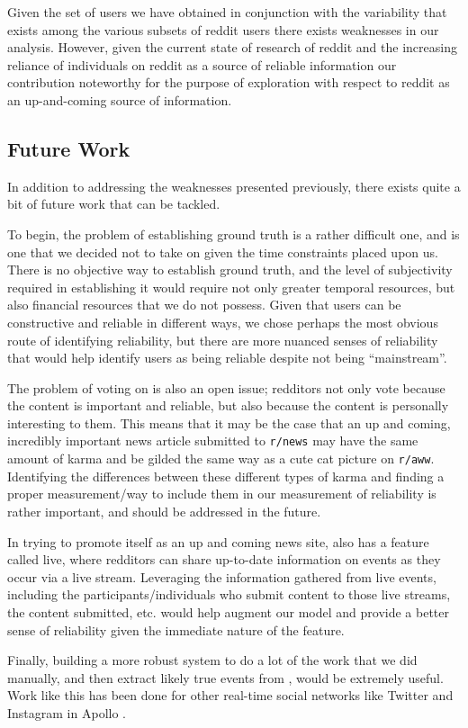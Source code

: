 Given the set of users we have obtained in conjunction with the variability that
exists among the various subsets of reddit users there exists weaknesses in our
analysis. However, given the current state of research of reddit and the
increasing reliance of individuals on reddit as a source of reliable information
our contribution noteworthy for the purpose of exploration with respect to
reddit as an up-and-coming source of information.


\subsection{Future Work} %
\label{sub:future_work}
In addition to addressing the weaknesses presented previously, there exists
quite a bit of future work that can be tackled.

To begin, the problem of establishing ground truth is a rather difficult one,
and is one that we decided not to take on given the time constraints placed upon
us. There is no objective way to establish ground truth, and the level of
subjectivity required in establishing it would require not only greater temporal
resources, but also financial resources that we do not possess. Given that users
can be constructive and reliable in different ways, we chose perhaps the most
obvious route of identifying reliability, but there are more nuanced senses of
reliability that would help identify users as being reliable despite not being
``mainstream''.

The problem of voting on \reddit{} is also an open issue; redditors not only
vote because the content is important and reliable, but also because the content
is personally interesting to them. This means that it may be the case that an up
and coming, incredibly important news article submitted to \texttt{r/news} may
have the same amount of karma and be gilded the same way as a cute cat picture
on \texttt{r/aww}. Identifying the differences between these different types of
karma and finding a proper measurement/way to include them in our measurement of
reliability is rather important, and should be addressed in the future.

In trying to promote itself as an up and coming news site, \reddit{} also has a
feature called \reddit{} live, where redditors can share up-to-date information
on events as they occur via a live stream. Leveraging the information gathered
from \reddit{} live events, including the participants/individuals who submit
content to those live streams, the content submitted, etc. would help augment
our model and provide a better sense of reliability given the immediate nature
of the feature.

Finally, building a more robust system to do a lot of the work that we did
manually, and then extract likely true events from \reddit{}, would be extremely
useful. Work like this has been done for other real-time social networks like
Twitter and Instagram in Apollo \cite{Le:2011:DDL:2070942.2071018}.

